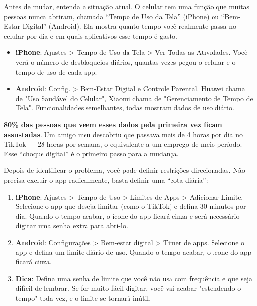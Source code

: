 


Antes de mudar, entenda a situação atual. O celular tem uma função que muitas pessoas nunca abriram, chamada “Tempo de Uso da Tela” (iPhone) ou “Bem-Estar Digital” (Android). Ela mostra quanto tempo você realmente passa no celular por dia e em quais aplicativos esse tempo é gasto.

\begin{itemize}
  \item \textbf{iPhone}: Ajustes > Tempo de Uso da Tela > Ver Todas as Atividades. Você verá o número de desbloqueios diários, quantas vezes pegou o celular e o tempo de uso de cada app.
  \item \textbf{Android}: Config. > Bem-Estar Digital e Controle Parental. Huawei chama de "Uso Saudável do Celular", Xiaomi chama de "Gerenciamento de Tempo de Tela". Funcionalidades semelhantes, todas mostram dados de uso diário.
\end{itemize}

\textbf{80\% das pessoas que veem esses dados pela primeira vez ficam assustadas}. Um amigo meu descobriu que passava mais de 4 horas por dia no TikTok — 28 horas por semana, o equivalente a um emprego de meio período. Esse “choque digital” é o primeiro passo para a mudança.


Depois de identificar o problema, você pode definir restrições direcionadas. Não precisa excluir o app radicalmente, basta definir uma “cota diária”:

\begin{enumerate}
  \item \textbf{iPhone}: Ajustes > Tempo de Uso > Limites de Apps > Adicionar Limite. Selecione o app que deseja limitar (como o TikTok) e defina 30 minutos por dia. Quando o tempo acabar, o ícone do app ficará cinza e será necessário digitar uma senha extra para abri-lo.
  \item \textbf{Android}: Configurações > Bem-estar digital > Timer de apps. Selecione o app e defina um limite diário de uso. Quando o tempo acabar, o ícone do app ficará cinza.
  \item \textbf{Dica}: Defina uma senha de limite que você não usa com frequência e que seja difícil de lembrar. Se for muito fácil digitar, você vai acabar "estendendo o tempo" toda vez, e o limite se tornará inútil.
\end{enumerate}

